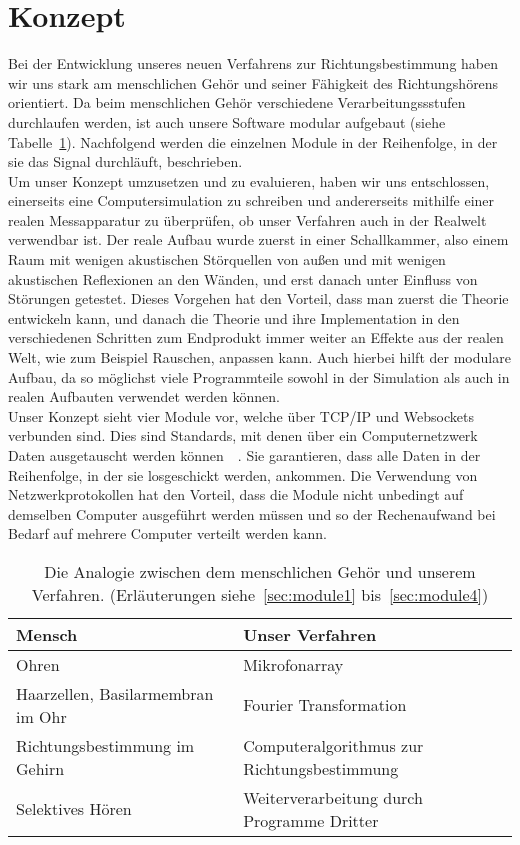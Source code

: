 \section{Konzept}
Bei der Entwicklung unseres neuen Verfahrens zur Richtungsbestimmung haben wir uns stark am menschlichen Gehör und seiner Fähigkeit des Richtungshörens orientiert. Da beim menschlichen Gehör verschiedene Verarbeitungssstufen durchlaufen werden, ist auch unsere Software modular aufgebaut (siehe Tabelle~\ref{analog}). Nachfolgend werden die einzelnen Module in der Reihenfolge, in der sie das Signal durchläuft, beschrieben.\\
Um unser Konzept umzusetzen und zu evaluieren, haben wir uns entschlossen, einerseits eine Computersimulation zu schreiben und andererseits mithilfe einer realen Messapparatur zu überprüfen, ob unser Verfahren auch in der Realwelt verwendbar ist. Der reale Aufbau wurde zuerst in einer Schallkammer, also einem Raum mit wenigen akustischen Störquellen von außen und mit wenigen akustischen Reflexionen an den Wänden, und erst danach unter Einfluss von Störungen getestet. Dieses Vorgehen hat den Vorteil, dass man zuerst die Theorie entwickeln kann, und danach die Theorie und ihre Implementation in den verschiedenen Schritten zum Endprodukt immer weiter an Effekte aus der realen Welt, wie zum Beispiel Rauschen, anpassen kann. Auch hierbei hilft der modulare Aufbau, da so möglichst viele Programmteile sowohl in der Simulation als auch in realen Aufbauten verwendet werden können.\\
Unser Konzept sieht vier Module vor, welche über TCP/IP und Websockets verbunden sind. Dies sind Standards, mit denen über ein Computernetzwerk Daten ausgetauscht werden können~\cite{tcp}~\cite{websockets}. Sie garantieren, dass alle Daten in der Reihenfolge, in der sie losgeschickt werden, ankommen. Die Verwendung von Netzwerkprotokollen hat den Vorteil, dass die Module nicht unbedingt auf demselben Computer ausgeführt werden müssen und so der Rechenaufwand bei Bedarf auf mehrere Computer verteilt werden kann.
\begin{table}[h]
	\centering
	\begin{tabular}{ll}
      Mensch            & Unser Verfahren                                   \\ \midrule
      Ohren             & Mikrofonarray                              \\
      Haarzellen, Basilarmembran im Ohr & Fourier Transformation                     \\
      Richtungsbestimmung im Gehirn            & Computeralgorithmus zur Richtungsbestimmung                       \\
      Selektives Hören  & Weiterverarbeitung durch Programme Dritter
	\end{tabular}
    \caption{Die Analogie zwischen dem menschlichen Gehör und unserem Verfahren. (Erläuterungen siehe~\ref{sec:module1} bis~\ref{sec:module4})\label{analog}}
\end{table}

